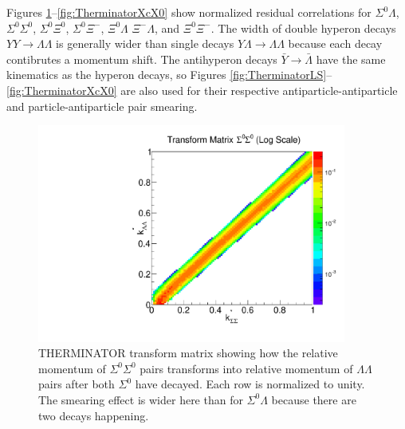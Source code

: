 Figures \ref{fig:TherminatorSS}--\ref{fig:TherminatorXcX0} show normalized residual correlations for $\Sigma^0\Lambda$, $\Sigma^0\Sigma^0$, $\Sigma^0\Xi^{0}$, $\Sigma^0\Xi^{-}$, $\Xi^0\Lambda$ $\Xi^{-}\Lambda$, and $\Xi^0\Xi^{-}$. 
The width of double hyperon decays $YY \rightarrow \Lambda\Lambda$ is generally wider than single decays $Y\Lambda \rightarrow \Lambda\Lambda$ because each decay contibrutes a momentum shift.
The antihyperon decays $\bar{Y} \rightarrow \bar{\Lambda}$ have the same kinematics as the hyperon decays, so Figures \ref{fig:TherminatorLS}--\ref{fig:TherminatorXcX0} are also used for their respective antiparticle-antiparticle and particle-antiparticle pair smearing.

\begin{figure}[hbt]
\begin{center}
\includegraphics[width=24pc]{Figures/TransformMatrices/2016-7-20-TransformMatrixSigmaSigmaNormLog.pdf}
\end{center}
\caption[Transform matrix for $k^*_{\Sigma^0\Sigma^0} \rightarrow k^*_{\Lambda\Lambda}$]{THERMINATOR \cite{Chojnacki:2011hb} transform matrix showing how the relative momentum of $\Sigma^0\Sigma^0$ pairs transforms into relative momentum of $\Lambda\Lambda$ pairs after both $\Sigma^0$ have decayed. Each row is normalized to unity. The smearing effect is wider here than for $\Sigma^0\Lambda$ because there are two decays happening.}
\label{fig:TherminatorSS}
\end{figure}

